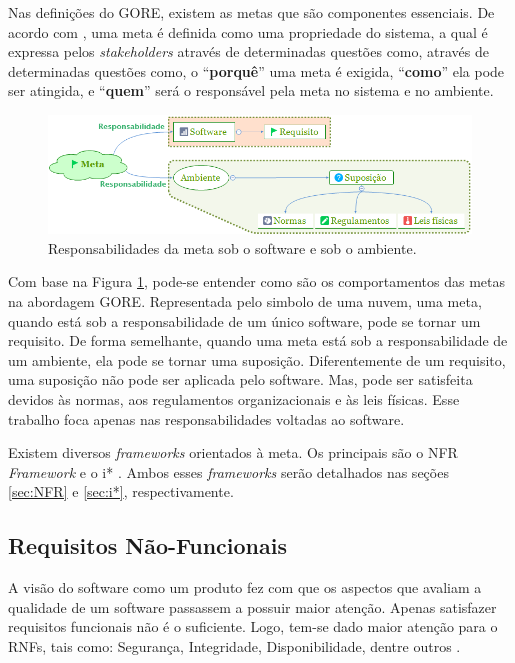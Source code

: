 Nas definições do GORE, existem as metas que são componentes essenciais. De acordo com \cite{van2001goal}, uma meta é definida como uma propriedade do sistema, a qual é expressa pelos \textit{stakeholders} através de determinadas questões como, através de determinadas questões como, o “\textbf{porquê}” uma meta é exigida, “\textbf{como}” ela pode ser atingida, e “\textbf{quem}” será o responsável pela meta no sistema e no ambiente.

\begin{figure}[h!]
	\centering
	\includegraphics[keepaspectratio=true,scale=0.8]{figuras/GORE.png}
	\caption{Responsabilidades da meta sob o software e sob o ambiente.}
	\label{Gore}
\end{figure}


\pagebreak

 Com base na Figura \ref{Gore}, pode-se entender como são os comportamentos das metas na abordagem GORE. Representada pelo simbolo de uma nuvem, uma meta, quando está sob a responsabilidade de um único software, pode se tornar um requisito. De forma semelhante, quando uma meta está sob a responsabilidade de um ambiente, ela pode se tornar uma suposição. Diferentemente de um requisito, uma suposição não pode ser aplicada pelo software. Mas, pode ser satisfeita devidos às normas, aos regulamentos organizacionais e às leis físicas\cite{van2001goal}. Esse trabalho foca apenas nas responsabilidades voltadas ao software.


Existem diversos \textit{frameworks} orientados à meta. Os principais  são o NFR \textit{Framework} \cite{chung2012non} e o i* \cite{istarwiki20}. Ambos esses \textit{frameworks} serão detalhados nas seções \ref{sec:NFR} e \ref{sec:i*}, respectivamente.

\subsection{Requisitos Não-Funcionais}
\label{subsec:requisitosNaoFuncionais}

A visão do software como um produto fez com que os aspectos que avaliam a qualidade de um software passassem a possuir maior atenção. Apenas satisfazer requisitos funcionais não é o suficiente. Logo, tem-se dado maior atenção para o RNFs, tais como: Segurança, Integridade, Disponibilidade, dentre outros \cite{cysneiros1997definindo}.

